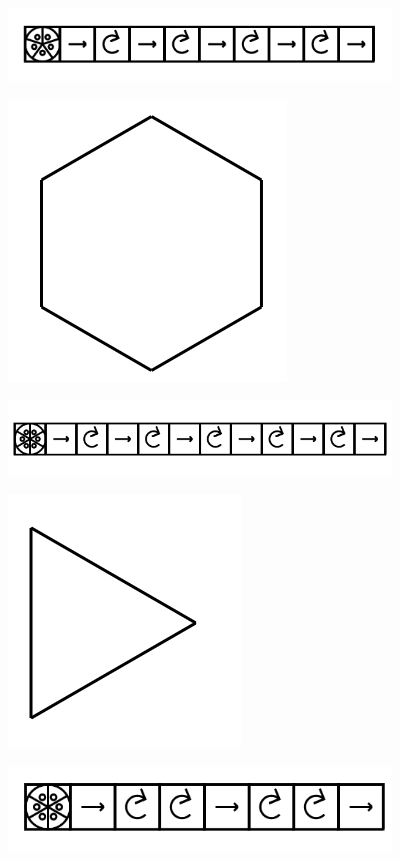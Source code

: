 \documentclass[11pt]{article}
\begin{document}
\includegraphics[width=4in]{image7.png}







\includegraphics{image8.png}

\includegraphics[width=4in]{image9.png}







\includegraphics{image10.png}

\includegraphics[width=4in]{image11.png}
\end{document}
